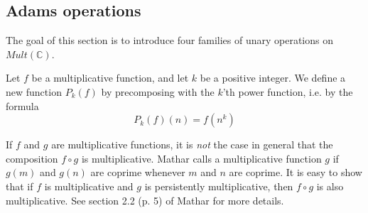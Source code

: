 \documentclass[a4paper]{article}
\begin{document}
\subsection{Adams operations}

The goal of this section is to introduce four families of unary operations on $Mult(\mathbb{C})$.








\begin{definition}
Let $f$ be a multiplicative function, and let $k$ be a positive integer. We define a new function $P_k(f)$ by precomposing with the $k$'th power function, i.e. by the formula
$$ P_k(f)(n) = f(n^k)   $$
\end{definition}

\begin{remark}
If $f$ and $g$ are multiplicative functions, it is \emph{not} the case in general that the composition $f \circ g$ is multiplicative. Mathar calls a multiplicative function $g$  if $g(m)$ and $g(n)$ are coprime whenever $m$ and $n$ are coprime. It is easy to show that if $f$ is multiplicative and $g$ is persistently multiplicative, then $f \circ g$ is also multiplicative. See section 2.2 (p. 5) of Mathar for more details.
\end{remark}
\end{document}
